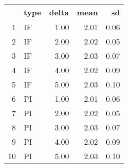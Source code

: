 \begin{table}[ht]
\centering
\begin{tabular}{rlrrr}
  \hline
 & type & delta & mean & sd \\ 
  \hline
1 & IF & 1.00 & 2.01 & 0.06 \\ 
  2 & IF & 2.00 & 2.02 & 0.05 \\ 
  3 & IF & 3.00 & 2.03 & 0.07 \\ 
  4 & IF & 4.00 & 2.02 & 0.09 \\ 
  5 & IF & 5.00 & 2.03 & 0.10 \\ 
  6 & PI & 1.00 & 2.01 & 0.06 \\ 
  7 & PI & 2.00 & 2.02 & 0.05 \\ 
  8 & PI & 3.00 & 2.03 & 0.07 \\ 
  9 & PI & 4.00 & 2.02 & 0.09 \\ 
  10 & PI & 5.00 & 2.03 & 0.10 \\ 
   \hline
\end{tabular}
\end{table}
